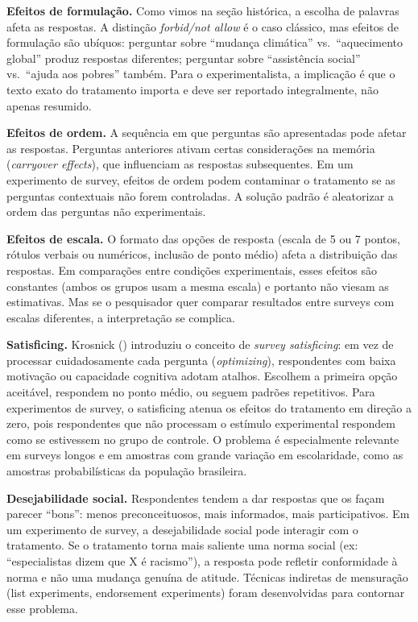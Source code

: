 \documentclass[
]{article}
\begin{document}
\textbf{Efeitos de formulação.} Como vimos na seção histórica, a escolha de palavras afeta as respostas. A distinção \emph{forbid/not allow} é o caso clássico, mas efeitos de formulação são ubíquos: perguntar sobre ``mudança climática'' vs.~``aquecimento global'' produz respostas diferentes; perguntar sobre ``assistência social'' vs.~``ajuda aos pobres'' também. Para o experimentalista, a implicação é que o texto exato do tratamento importa e deve ser reportado integralmente, não apenas resumido.

\textbf{Efeitos de ordem.} A sequência em que perguntas são apresentadas pode afetar as respostas. Perguntas anteriores ativam certas considerações na memória (\emph{carryover effects}), que influenciam as respostas subsequentes. Em um experimento de survey, efeitos de ordem podem contaminar o tratamento se as perguntas contextuais não forem controladas. A solução padrão é aleatorizar a ordem das perguntas não experimentais.

\textbf{Efeitos de escala.} O formato das opções de resposta (escala de 5 ou 7 pontos, rótulos verbais ou numéricos, inclusão de ponto médio) afeta a distribuição das respostas. Em comparações entre condições experimentais, esses efeitos são constantes (ambos os grupos usam a mesma escala) e portanto não viesam as estimativas. Mas se o pesquisador quer comparar resultados entre surveys com escalas diferentes, a interpretação se complica.

\textbf{Satisficing.} Krosnick () introduziu o conceito de \emph{survey satisficing}: em vez de processar cuidadosamente cada pergunta (\emph{optimizing}), respondentes com baixa motivação ou capacidade cognitiva adotam atalhos. Escolhem a primeira opção aceitável, respondem no ponto médio, ou seguem padrões repetitivos. Para experimentos de survey, o satisficing atenua os efeitos do tratamento em direção a zero, pois respondentes que não processam o estímulo experimental respondem como se estivessem no grupo de controle. O problema é especialmente relevante em surveys longos e em amostras com grande variação em escolaridade, como as amostras probabilísticas da população brasileira.

\textbf{Desejabilidade social.} Respondentes tendem a dar respostas que os façam parecer ``bons'': menos preconceituosos, mais informados, mais participativos. Em um experimento de survey, a desejabilidade social pode interagir com o tratamento. Se o tratamento torna mais saliente uma norma social (ex: ``especialistas dizem que X é racismo''), a resposta pode refletir conformidade à norma e não uma mudança genuína de atitude. Técnicas indiretas de mensuração (list experiments, endorsement experiments) foram desenvolvidas para contornar esse problema.
\end{document}
